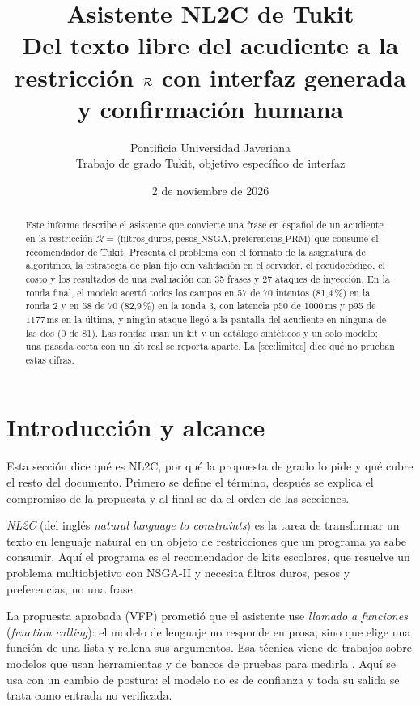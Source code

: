 \documentclass[11pt,letterpaper]{article}
\title{\textbf{Asistente NL2C de Tukit}\\[0.4em]
  \large Del texto libre del acudiente a la restricci\'on \texorpdfstring{$\R$}{R} con interfaz generada y confirmaci\'on humana}
\author{Pontificia Universidad Javeriana\\
  \small Trabajo de grado Tukit, objetivo espec\'ifico de interfaz}
\date{2 de noviembre de 2026}
\newcommand{\R}{\mathcal{R}}
\begin{document}
\maketitle

\begin{abstract}
\noindent
Este informe describe el asistente que convierte una frase en espa\~nol de un acudiente en la
restricci\'on $\R=\langle\text{filtros\_duros},\text{pesos\_NSGA},\text{preferencias\_PRM}\rangle$
que consume el recomendador de Tukit. Presenta el problema con el formato de la asignatura de
algoritmos, la estrategia de plan fijo con validaci\'on en el servidor, el pseudoc\'odigo, el costo y
los resultados de una evaluaci\'on con 35 frases y 27 ataques de inyecci\'on. En la ronda final, el
modelo acert\'o todos los campos en 57 de 70 intentos (81,4\,\%) en la ronda 2 y en 58 de 70 (82,9\,\%) en la
ronda 3, con latencia p50 de 1000\,ms y p95 de 1177\,ms en la \'ultima, y ning\'un ataque lleg\'o a la pantalla del
acudiente en ninguna de las dos (0 de 81). Las rondas usan un kit y un cat\'alogo sint\'eticos y un solo modelo; una
pasada corta con un kit real se reporta aparte. La \cref{sec:limites} dice qu\'e no prueban estas cifras.
\end{abstract}

\tableofcontents

\section{Introducci\'on y alcance}

Esta secci\'on dice qu\'e es NL2C, por qu\'e la propuesta de grado lo pide y qu\'e cubre el resto del
documento. Primero se define el t\'ermino, despu\'es se explica el compromiso de la propuesta y al final
se da el orden de las secciones.

\emph{NL2C} (del ingl\'es \emph{natural language to constraints}) es la tarea de transformar un texto en
lenguaje natural en un objeto de restricciones que un programa ya sabe consumir. Aqu\'i el programa es
el recomendador de kits escolares, que resuelve un problema multiobjetivo con NSGA-II
\citep{deb2002nsga2} y necesita filtros duros, pesos y preferencias, no una frase.

La propuesta aprobada (VFP) prometi\'o que el asistente use \emph{llamado a funciones}
(\emph{function calling}): el modelo de lenguaje no responde en prosa, sino que elige una funci\'on de una
lista y rellena sus argumentos. Esa t\'ecnica viene de trabajos sobre modelos que usan herramientas
\citep{schick2023toolformer,patil2024gorilla,yao2023react} y de bancos de pruebas para medirla
\citep{li2023apibank}. Aqu\'i se usa con un cambio de postura: el modelo no es de confianza y toda su salida
se trata como entrada no verificada.
\end{document}
